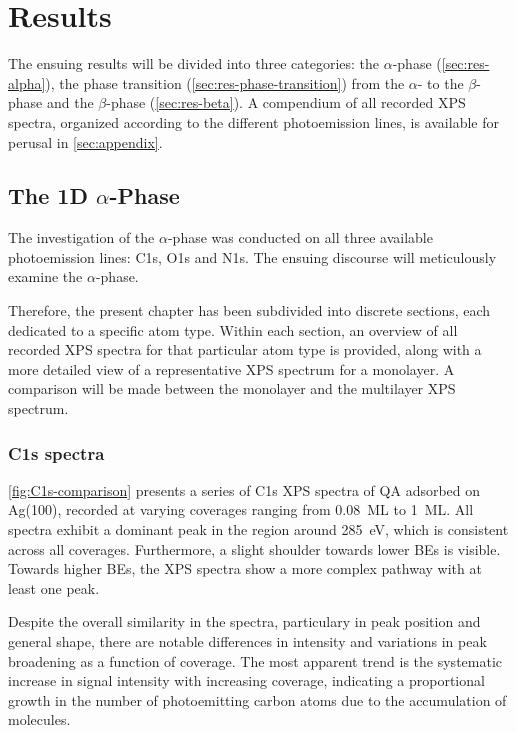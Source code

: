 \chapter{Results}
\label{sec:results}
\raggedbottom

The ensuing results will be divided into three categories: the $\alpha$-phase (\autoref{sec:res-alpha}), the phase transition (\autoref{sec:res-phase-transition}) from the $\alpha$- to the $\beta$-phase and the $\beta$-phase (\autoref{sec:res-beta}). A compendium of all recorded \ac{XPS} spectra, organized according to the different photoemission lines, is available for perusal in \autoref{sec:appendix}.

\section{The 1D \texorpdfstring{$\alpha$}{alpha}-Phase}
\label{sec:res-alpha}

The investigation of the $\alpha$-phase was conducted on all three available photoemission lines: C1s, O1s and N1s. The ensuing discourse will meticulously examine the $\alpha$-phase.

Therefore, the present chapter has been subdivided into discrete sections, each dedicated to a specific atom type. Within each section, an overview of all recorded \ac{XPS} spectra for that particular atom type is provided, along with a more detailed view of a representative \ac{XPS} spectrum for a monolayer. A comparison will be made between the monolayer and the multilayer \ac{XPS} spectrum.

\clearpage
\subsection{C1s spectra}
\label{sec:C1s-alpha}

\autoref{fig:C1s-comparison} presents a series of C1s \ac{XPS} spectra of \ac{QA} adsorbed on Ag(100), recorded at varying coverages ranging from 0.08~\ac{ML} to 1~\ac{ML}. All spectra exhibit a dominant peak in the region around 285~\si{\eV}, which is consistent across all coverages. Furthermore, a slight shoulder towards lower \acp{BE} is visible. Towards higher \acp{BE}, the \ac{XPS} spectra show a more complex pathway with at least one peak.

Despite the overall similarity in the spectra, particulary in peak position and general shape, there are notable differences in intensity and variations in peak broadening as a function of coverage. The most apparent trend is the systematic increase in signal intensity with increasing coverage, indicating a proportional growth in the number of photoemitting carbon atoms due to the accumulation of molecules.

